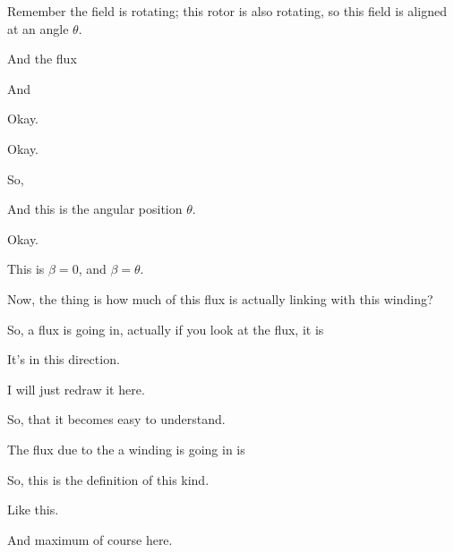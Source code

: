 \documentclass{article}
\begin{document}
Remember the field is rotating; this rotor is also rotating, so this field is aligned at an angle $\theta$.







And the flux













And



Okay.

Okay.

So,



And this is the angular position $\theta$.

Okay.

This is $\beta = 0$, and $\beta = \theta$.

Now, the thing is how much of this flux is actually linking with this winding?

So, a flux is going in, actually if you look at the flux, it is

It's in this direction.

I will just redraw it here.

So, that it becomes easy to understand.

The flux due to the a winding is going in is

So, this is the definition of this kind.







Like this.

And maximum of course here.



\end{document}
